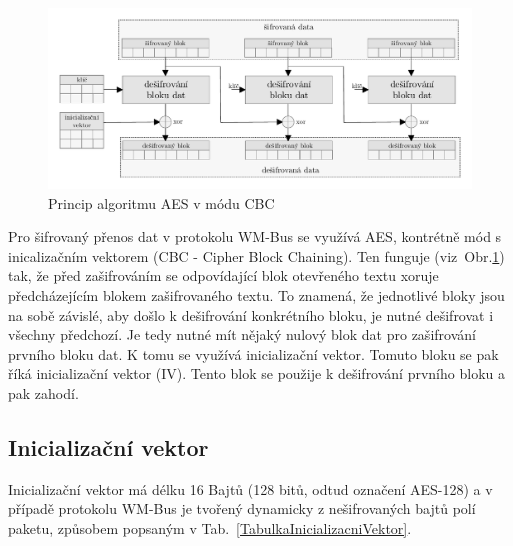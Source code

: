 \begin{figure}[!ht]
\vspace{-10pt}
 \begin{center}
    \includegraphics[scale=0.7]{obrazky/wmbus_aes_cbc}
  \end{center}
	\vspace{-30pt}
  \caption{Princip algoritmu AES v módu CBC}
	\label{SchemaAEScbc}
	\vspace{-10pt}
\end{figure}

Pro šifrovaný přenos dat v protokolu WM-Bus se využívá AES, kontrétně mód s inicalizačním vektorem (CBC - Cipher Block Chaining). Ten funguje (viz~Obr.\ref{SchemaAEScbc}) tak, že před zašifrováním se odpovídající blok otevřeného textu xoruje předcházejícím blokem zašifrovaného textu. To znamená, že jednotlivé bloky jsou na sobě závislé, aby došlo k dešifrování konkrétního bloku, je nutné  dešifrovat i všechny předchozí. Je tedy nutné mít nějaký nulový blok dat pro zašifrování prvního bloku dat. K tomu se využívá inicializační vektor. Tomuto bloku se pak říká inicializační vektor (IV). Tento blok se použije k dešifrování prvního bloku a pak zahodí.



\subsection{Inicializační vektor}
Inicializační vektor má délku 16 Bajtů (128 bitů, odtud označení AES-128) a v případě protokolu WM-Bus je tvořený dynamicky z nešifrovaných bajtů polí paketu, způsobem popsaným v Tab.~\ref{TabulkaInicializacniVektor}.

